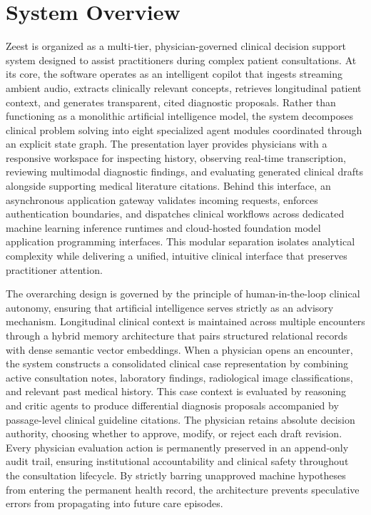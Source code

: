 \section{System Overview}
Zeest is organized as a multi-tier, physician-governed clinical decision support system designed to assist practitioners during complex patient consultations. At its core, the software operates as an intelligent copilot that ingests streaming ambient audio, extracts clinically relevant concepts, retrieves longitudinal patient context, and generates transparent, cited diagnostic proposals. Rather than functioning as a monolithic artificial intelligence model, the system decomposes clinical problem solving into eight specialized agent modules coordinated through an explicit state graph. The presentation layer provides physicians with a responsive workspace for inspecting history, observing real-time transcription, reviewing multimodal diagnostic findings, and evaluating generated clinical drafts alongside supporting medical literature citations. Behind this interface, an asynchronous application gateway validates incoming requests, enforces authentication boundaries, and dispatches clinical workflows across dedicated machine learning inference runtimes and cloud-hosted foundation model application programming interfaces. This modular separation isolates analytical complexity while delivering a unified, intuitive clinical interface that preserves practitioner attention.

The overarching design is governed by the principle of human-in-the-loop clinical autonomy, ensuring that artificial intelligence serves strictly as an advisory mechanism. Longitudinal clinical context is maintained across multiple encounters through a hybrid memory architecture that pairs structured relational records with dense semantic vector embeddings. When a physician opens an encounter, the system constructs a consolidated clinical case representation by combining active consultation notes, laboratory findings, radiological image classifications, and relevant past medical history. This case context is evaluated by reasoning and critic agents to produce differential diagnosis proposals accompanied by passage-level clinical guideline citations. The physician retains absolute decision authority, choosing whether to approve, modify, or reject each draft revision. Every physician evaluation action is permanently preserved in an append-only audit trail, ensuring institutional accountability and clinical safety throughout the consultation lifecycle. By strictly barring unapproved machine hypotheses from entering the permanent health record, the architecture prevents speculative errors from propagating into future care episodes.

